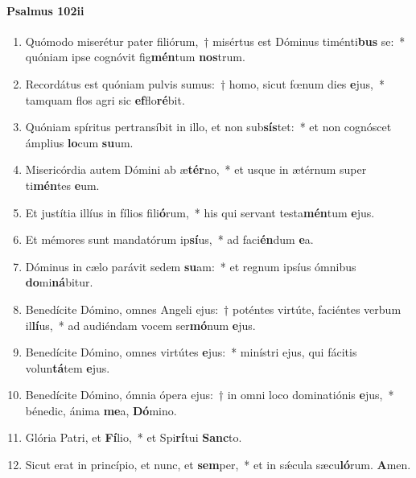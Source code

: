 \documentclass[twoside]{article}
\begin{document}
\begin{paracol}[1]{2}
\paragraph{Psalmus 102ii}
\begin{enumerate}[wide, itemsep=0mm, labelwidth=!, labelindent=0pt, label=\color{gregoriocolor}\theenumi]
\item Quómodo miserétur pater filiórum,~† misértus est Dóminus timénti\textbf{bus} se:~* quóniam ipse cognóvit fig\textbf{mén}tum \textbf{nos}trum.
\item Recordátus est quóniam pulvis sumus:~† homo, sicut fœnum dies \textbf{e}jus,~* tamquam flos agri sic \textbf{ef}flo\textbf{ré}bit.
\item Quóniam spíritus pertransíbit in illo, et non sub\textbf{sís}tet:~* et non cognóscet ámplius \textbf{lo}cum \textbf{su}um.
\item Misericórdia autem Dómini ab æ\textbf{tér}no,~* et usque in ætérnum super ti\textbf{mén}tes \textbf{e}um.
\item Et justítia illíus in fílios fili\textbf{ó}rum,~* his qui servant testa\textbf{mén}tum \textbf{e}jus.
\item Et mémores sunt mandatórum ip\textbf{sí}us,~* ad faci\textbf{én}dum \textbf{e}a.
\item Dóminus in cælo parávit sedem \textbf{su}am:~* et regnum ipsíus ómnibus \textbf{do}mi\textbf{ná}bitur.
\item Benedícite Dómino, omnes Angeli ejus:~† poténtes virtúte, faciéntes verbum il\textbf{lí}us,~* ad audiéndam vocem ser\textbf{mó}num \textbf{e}jus.
\item Benedícite Dómino, omnes virtútes \textbf{e}jus:~* minístri ejus, qui fácitis volun\textbf{tá}tem \textbf{e}jus.
\item Benedícite Dómino, ómnia ópera ejus:~† in omni loco dominatiónis \textbf{e}jus,~* bénedic, ánima \textbf{me}a, \textbf{Dó}mino.
\item Glória Patri, et \textbf{Fí}lio,~* et Spi\textbf{rí}tui \textbf{Sanc}to.
\item Sicut erat in princípio, et nunc, et \textbf{sem}per,~* et in sǽcula sæcu\textbf{ló}rum. \textbf{A}men.
\end{enumerate}

\switchcolumn


\end{paracol}
\end{document}
